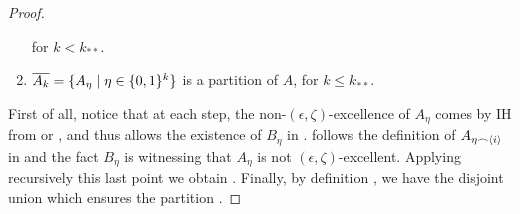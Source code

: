 \begin{lemma}[Claim 5.4]
\begin{proof}
\begin{enumerate}
                    for $k < k_{**}$.
                \item\label{itm:existance_of_excellent_subsets.7} $\overline{A_k} = \{ A_\eta \mid \eta \in \{ 0,1 \}^k \}$ is a partition of $A$,
                    for $k \leq k_{**}$.
            \end{enumerate}
            First of all, notice that at each step, the non-$(\epsilon, \zeta)$-excellence of $A_\eta$ comes by IH
            from  or ,
            and thus allows the existence of $B_\eta$ in .
             follows the definition of $A_{\eta \frown \left< i \right>}$ in
             and the fact $B_\eta$ is witnessing that $A_\eta$ is not $(\epsilon, \zeta)$-excellent.
            Applying recursively this last point we obtain .
            Finally, by definition , we have the disjoint union
             which ensures
            the partition .


\end{proof}
\end{lemma}
